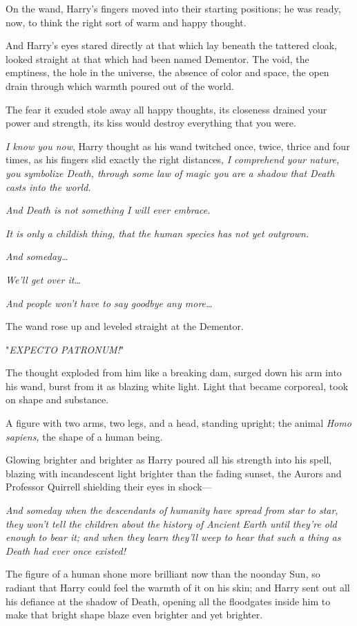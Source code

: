 On the wand, Harry's fingers moved into their starting positions; he was ready, 
now, to think the right sort of warm and happy thought.

And Harry's eyes stared directly at that which lay beneath the tattered cloak, 
looked straight at that which had been named Dementor. The void, the emptiness, 
the hole in the universe, the absence of color and space, the open drain 
through which warmth poured out of the world.

The fear it exuded stole away all happy thoughts, its closeness drained your 
power and strength, its kiss would destroy everything that you were.

\emph{I know you now}, Harry thought as his wand twitched once, twice, thrice 
and four times, as his fingers slid exactly the right distances, \emph{I 
comprehend your nature, you symbolize Death, through some law of magic you are 
a shadow that Death casts into the world.}

\emph{And Death is not something I will ever embrace.}

\emph{It is only a childish thing, that the human species has not yet outgrown.}

\emph{And someday{\ldots}}

\emph{We'll get over it{\ldots}}

\emph{And people won't have to say goodbye any more{\ldots}}

The wand rose up and leveled straight at the Dementor.

"\emph{EXPECTO PATRONUM!}"

The thought exploded from him like a breaking dam, surged down his arm into his 
wand, burst from it as blazing white light. Light that became corporeal, took 
on shape and substance.

A figure with two arms, two legs, and a head, standing upright; the animal 
\emph{Homo sapiens,} the shape of a human being.

Glowing brighter and brighter as Harry poured all his strength into his spell, 
blazing with incandescent light brighter than the fading sunset, the Aurors and 
Professor Quirrell shielding their eyes in shock---

\emph{And someday when the descendants of humanity have spread from star to 
star, they won't tell the children about the history of Ancient Earth until 
they're old enough to bear it; and when they learn they'll weep to hear that 
such a thing as Death had ever once existed!}

The figure of a human shone more brilliant now than the noonday Sun, so radiant 
that Harry could feel the warmth of it on his skin; and Harry sent out all his 
defiance at the shadow of Death, opening all the floodgates inside him to make 
that bright shape blaze even brighter and yet brighter.

